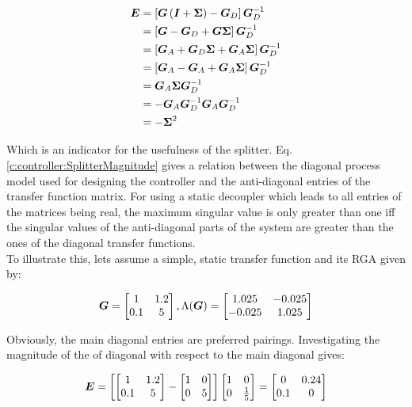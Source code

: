 \begin{align}
\begin{split}
\mbox{\boldmath$E$} &= \left[ \mbox{\boldmath$G$} \left(\mbox{\boldmath$I$}+\mbox{\boldmath$\Sigma$}\right)- \mbox{\boldmath$G$}_D \right]\mbox{\boldmath$G$}_D^{-1} \\
&= \left[\mbox{\boldmath$G$}-\mbox{\boldmath$G$}_D + \mbox{\boldmath$G$}\mbox{\boldmath$\Sigma$}\right]\mbox{\boldmath$G$}_D^{-1} \\
&= \left[\mbox{\boldmath$G$}_A + \mbox{\boldmath$G$}_D \mbox{\boldmath$\Sigma$}+\mbox{\boldmath$G$}_A \mbox{\boldmath$\Sigma$}\right]\mbox{\boldmath$G$}_D^{-1} \\
&= \left[\mbox{\boldmath$G$}_A - \mbox{\boldmath$G$}_A +\mbox{\boldmath$G$}_A \mbox{\boldmath$\Sigma$}\right]\mbox{\boldmath$G$}_D^{-1} \\
&= \mbox{\boldmath$G$}_A \mbox{\boldmath$\Sigma$}\mbox{\boldmath$G$}_D^{-1} \\
&= -\mbox{\boldmath$G$}_A\mbox{\boldmath$G$}_D^{-1}\mbox{\boldmath$G$}_A\mbox{\boldmath$G$}_D^{-1} \\
&= - \mbox{\boldmath$\Sigma$}^2
\end{split}
\label{c:controller:SplitterMagnitude}
\end{align}

Which is an indicator for the usefulness of the splitter. Eq.\ref{c:controller:SplitterMagnitude} gives a relation between the diagonal process model used for designing the controller and the anti-diagonal entries of the transfer function matrix. For using a static decoupler which leads to all entries of the matrices being real, the maximum singular value is only greater than one iff the singular values of the anti-diagonal parts of the system are greater than the ones of the diagonal transfer functions.\\

To illustrate this, lets assume a simple, static transfer function and its RGA given by:

\begin{align*}
\mbox{\boldmath$G$} = \begin{bmatrix}
1 & 1.2 \\
0.1 & 5
\end{bmatrix}, \Lambda(\mbox{\boldmath$G$}) = \begin{bmatrix}
1.025 & -0.025 \\
-0.025 & 1.025
\end{bmatrix}
\end{align*}

Obviously, the main diagonal entries are preferred pairings. Investigating the magnitude of the of diagonal with respect to the main diagonal gives:

\begin{align*}
\mbox{\boldmath$E$} = \left[ \begin{bmatrix}
1 & 1.2 \\ 0.1 & 5
\end{bmatrix} - \begin{bmatrix}
1 & 0 \\ 0 & 5
\end{bmatrix} \right]\begin{bmatrix}
1 & 0 \\ 0 & \frac{1}{5}
\end{bmatrix} = \begin{bmatrix}
0 & 0.24 \\ 0.1 & 0
\end{bmatrix} 
\end{align*}

